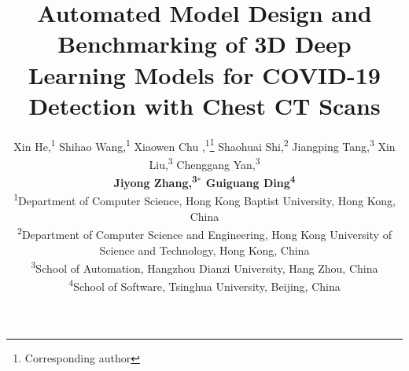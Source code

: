 \documentclass[letterpaper]{article}
\begin{document}
%


\title{Automated Model Design and Benchmarking of 3D Deep Learning Models for COVID-19 Detection with Chest CT Scans}


\author{Xin He,\textsuperscript{1}
Shihao Wang,\textsuperscript{1}
Xiaowen Chu ,\textsuperscript{1}\thanks{Corresponding author}
Shaohuai Shi,\textsuperscript{2}
Jiangping Tang,\textsuperscript{3}
Xin Liu,\textsuperscript{3}
Chenggang Yan,\textsuperscript{3}\\
{\bf \Large Jiyong Zhang,\textsuperscript{3}$^*$
Guiguang Ding\textsuperscript{4}}\\
\textsuperscript{1}{Department of Computer Science, Hong Kong Baptist University, Hong Kong, China}\\
\textsuperscript{2}{Department of Computer Science and Engineering, Hong Kong University of Science and Technology, Hong Kong, China}\\
\textsuperscript{3}{School of Automation, Hangzhou Dianzi University, Hang Zhou, China}\\
\textsuperscript{4}{School of Software, Tsinghua University, Beijing, China}\\
}
\end{document}
